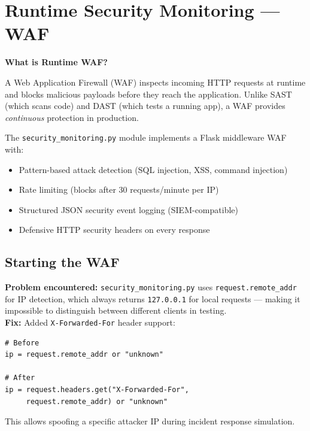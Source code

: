 \documentclass[12pt,a4paper]{report}
\begin{document}
\section{Runtime Security Monitoring — WAF}

\textbf{What is Runtime WAF?}

A Web Application Firewall (WAF) inspects incoming HTTP requests at runtime and blocks malicious payloads before they reach the application. Unlike SAST (which scans code) and DAST (which tests a running app), a WAF provides \textit{continuous} protection in production.

The \texttt{security\_monitoring.py} module implements a Flask middleware WAF with:
\begin{itemize}[leftmargin=1.5cm]
  \item Pattern-based attack detection (SQL injection, XSS, command injection)
  \item Rate limiting (blocks after 30 requests/minute per IP)
  \item Structured JSON security event logging (SIEM-compatible)
  \item Defensive HTTP security headers on every response
\end{itemize}

\subsection{Starting the WAF}

\begin{warningbox}
\textbf{Problem encountered:} \texttt{security\_monitoring.py} uses \texttt{request.remote\_addr} for IP detection, which always returns \texttt{127.0.0.1} for local requests — making it impossible to distinguish between different clients in testing.\\[4pt]
\textbf{Fix:} Added \texttt{X-Forwarded-For} header support:
\begin{lstlisting}[style=pythonstyle]
# Before
ip = request.remote_addr or "unknown"

# After
ip = request.headers.get("X-Forwarded-For",
     request.remote_addr) or "unknown"
\end{lstlisting}
This allows spoofing a specific attacker IP during incident response simulation.
\end{warningbox}
\end{document}
